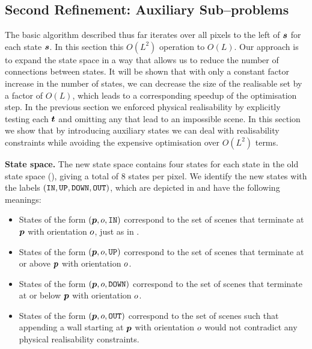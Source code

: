 \subsection{Second Refinement: Auxiliary Sub--problems}
\label{sec:aux-alg}

The basic algorithm described thus far iterates over all pixels to
the left of $\State$ for each state $\State$. In this section  this $O(L^2)$ operation to $O(L)$. Our approach is to
expand the state space in a way that allows us to reduce the number of
connections between states. It will be shown that with only a constant
factor increase in the number of states, we can decrease the size of
the realisable set by a factor of $O(L)$, which leads to a corresponding
speedup of the optimisation step. In the previous section we enforced
physical realisability by explicitly testing each $\OtherState$ and
omitting any that lead to an impossible scene. In this section we show
that by introducing auxiliary states we can deal with realisability
constraints while avoiding the expensive optimisation over $O(L^2)$
terms.

\textbf{State space.} The new state space contains four states for each
state in the old state space (), giving a total of 8
states per pixel. We identify the new states with the labels
$(\INlabel,\UPlabel,\DOWNlabel,\OUTlabel)$, which are depicted in
 and have the following meanings:
\begin{itemize}
  \item{States of the form $(\Pixel,\WallOrient,\INlabel)$ correspond
    to the set of scenes that terminate at $\Pixel$ with orientation
    $\WallOrient$, just as in .}
  \item{States of the form $(\Pixel,\WallOrient,\UPlabel)$ correspond
    to the set of scenes that terminate at or above $\Pixel$ with
    orientation $\WallOrient$.}
  \item{States of the form $(\Pixel,\WallOrient,\DOWNlabel)$
    correspond to the set of scenes that terminate at or below
    $\Pixel$ with orientation $\WallOrient$.}
  \item{States of the form $(\Pixel,\WallOrient,\OUTlabel)$ correspond
    to the set of scenes such that appending a wall starting at
    $\Pixel$ with orientation $\WallOrient$ would not contradict any
    physical realisability constraints.}
\end{itemize}

